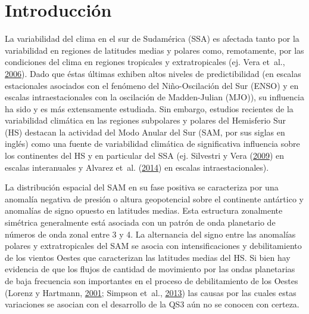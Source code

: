 \documentclass[spanish,a4paper,12pt,oneside]{book}
\begin{document}
\listoffigures
\newpage

\mainmatter

\chapter{Introducción}\label{introduccion}

La variabilidad del clima en el sur de Sudamérica (SSA) es afectada
tanto por la variabilidad en regiones de latitudes medias y polares
como, remotamente, por las condiciones del clima en regiones tropicales
y extratropicales (ej. Vera et~al.,
\protect\hyperlink{ref-Vera2006}{2006}). Dado que éstas últimas exhiben
altos niveles de predictibilidad (en escalas estacionales asociados con
el fenómeno del Niño-Oscilación del Sur (ENSO) y en escalas
intraestacionales con la oscilación de Madden-Julian (MJO)), su
influencia ha sido y es más extensamente estudiada. Sin embargo,
estudios recientes de la variabilidad climática en las regiones
subpolares y polares del Hemisferio Sur (HS) destacan la actividad del
Modo Anular del Sur (SAM, por sus siglas en inglés) como una fuente de
variabilidad climática de significativa influencia sobre los continentes
del HS y en particular del SSA (ej. Silvestri y Vera
(\protect\hyperlink{ref-Silvestri2009}{2009}) en escalas interanuales y
Alvarez et~al. (\protect\hyperlink{ref-Alvarez2014}{2014}) en escalas
intraestacionales).

La distribución espacial del SAM en su fase positiva se caracteriza por
una anomalía negativa de presión o altura geopotencial sobre el
continente antártico y anomalías de signo opuesto en latitudes medias.
Esta estructura zonalmente simétrica generalmente está asociada con un
patrón de onda planetario de números de onda zonal entre 3 y 4. La
alternancia del signo entre las anomalías polares y extratropicales del
SAM se asocia con intensificaciones y debilitamiento de los vientos
Oestes que caracterizan las latitudes medias del HS. Si bien hay
evidencia de que los flujos de cantidad de movimiento por las ondas
planetarias de baja frecuencia son importantes en el proceso de
debilitamiento de los Oestes (Lorenz y Hartmann,
\protect\hyperlink{ref-Lorenz2001}{2001}; Simpson et~al.,
\protect\hyperlink{ref-Simpson2013}{2013}) las causas por las cuales
estas variaciones se asocian con el desarrollo de la QS3 aún no se
conocen con certeza.
\end{document}
